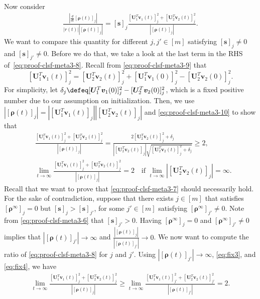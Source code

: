 \documentclass{article} %
\def\vs{{\bm{s}}}
\def\vv{{\bm{v}}}
\def\mU{{\bm{U}}}
\newcommand{\vrho}{{\bm{\rho}}}
\begin{document}
Now consider
\begin{align}
\label{eq:proof-clsf-meta3-8}
    \frac{\left | \frac{d}{dt} [\vrho(t)]_j \right |}{|r(t)||[\vrho(t)]_j|} 
    = [\vs]_j \frac{[\mU_1^T \vv_1(t)]_j^2 + [\mU_2^T \vv_2(t)]_j^2}{|[\vrho(t)]_j|}.
\end{align}
We want to compare this quantity for different $j,j' \in [m]$ satisfying $[\vs]_j \neq 0$ and $[\vs]_{j'} \neq 0$. Before we do that, we take a look at the last term in the RHS of~\eqref{eq:proof-clsf-meta3-8}. Recall from \eqref{eq:proof-clsf-meta3-9} that 
\begin{equation}
\label{eq:proof-clsf-meta3-10}
[\mU_1^T \vv_1(t)]_j^2 = [\mU_2^T \vv_2(t)]_j^2+[\mU_1^T \vv_1(0)]_j^2- [\mU_2^T \vv_2(0)]_j^2.
\end{equation}
For simplicity, let $\delta_j \defeq [\mU_1^T \vv_1(0)]_j^2- [\mU_2^T \vv_2(0)]_j^2$, which is a fixed positive number due to our assumption on initialization. Then, we use $|[\vrho(t)]_j|=|[\mU_1^T \vv_1(t)]_j||[\mU_2^T \vv_2(t)]_j|$ and \eqref{eq:proof-clsf-meta3-10} to show that
\begin{align}
	&\frac{[\mU_1^T \vv_1(t)]_j^2 + [\mU_2^T \vv_2(t)]_j^2}{|[\vrho(t)]_j|}
	=
	\frac{2 [\mU_2^T \vv_2(t)]_j^2 + \delta_j}
	{|[\mU_2^T \vv_2(t)]_j| \sqrt{[\mU_2^T \vv_2(t)]_j^2+\delta_j}}
	\geq 2,\label{eq:fix3}\\
	&\lim_{t \to \infty}
	\frac{[\mU_1^T \vv_1(t)]_j^2 + [\mU_2^T \vv_2(t)]_j^2}{|[\vrho(t)]_j|}
	= 2 \text{~~~if } \lim_{t \to \infty} |[\mU_2^T \vv_2(t)]_j| = \infty.\label{eq:fix4}
\end{align}
Recall that we want to prove that \eqref{eq:proof-clsf-meta3-7} should necessarily hold. For the sake of contradiction, suppose that there exists $j \in [m]$ that satisfies $[\vrho^\infty]_j = 0$ but $[\vs]_j > [\vs]_{j'}$, for some $j' \in [m]$ satisfying $[\vrho^\infty]_{j'} \neq 0$. 
Note from \eqref{eq:proof-clsf-meta3-6} that $[\vs]_{j'} > 0$.
Having $[\vrho^\infty]_j = 0$ and $[\vrho^\infty]_{j'} \neq 0$ implies that $|[\vrho(t)]_{j'}| \to \infty$ and $\frac{|[\vrho(t)]_j|}{|[\vrho(t)]_{j'}|} \to 0$.
We now want to compute the ratio of \eqref{eq:proof-clsf-meta3-8} for $j$ and $j'$.
Using $|[\vrho(t)]_{j'}| \to \infty$, \eqref{eq:fix3}, and \eqref{eq:fix4}, we have 
\begin{align}
	\label{eq:proof-clsf-meta3-11}
	\lim_{t\to\infty} \frac{[\mU_1^T \vv_1(t)]_{j}^2 + [\mU_2^T \vv_2(t)]_{j}^2}{|[\vrho(t)]_{j}|}
	\geq
	\lim_{t\to\infty} \frac{[\mU_1^T \vv_1(t)]_{j'}^2 + [\mU_2^T \vv_2(t)]_{j'}^2}{|[\vrho(t)]_{j'}|} = 2.
\end{align}
\end{document}

